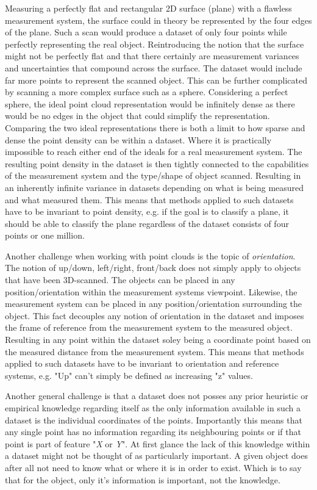 \documentclass[%
]{USN-MSc}
\begin{document}
Measuring a perfectly flat and rectangular 2D surface (plane) with a flawless measurement system, the surface could in theory be represented by the four edges of the plane. Such a scan would produce a dataset of only four points while perfectly representing the real object. Reintroducing the notion that the surface might not be perfectly flat and that there certainly are measurement variances and uncertainties that compound across the surface. The dataset would include far more points to represent the scanned object. This can be further complicated by scanning a more complex surface such as a sphere. Considering a perfect sphere, the ideal point cloud representation would be infinitely dense as there would be no edges in the object that could simplify the representation. Comparing the two ideal representations there is both a limit to how sparse and dense the point density can be within a dataset. Where it is practically impossible to reach either end of the ideals for a real measurement system. The resulting point density in the dataset is then tightly connected to the capabilities of the measurement system and the type/shape of object scanned. Resulting in an inherently infinite variance in datasets depending on what is being measured and what measured them. This means that methods applied to such datasets have to be invariant to point density, e.g. if the goal is to classify a plane, it should be able to classify the plane regardless of the dataset consists of four points or one million.

\bigskip
Another challenge when working with point clouds is the topic of \textit{orientation}. The notion of up/down, left/right, front/back does not simply apply to objects that have been 3D-scanned. The objects can be placed in any position/orientation within the measurement systems viewpoint. Likewise, the measurement system can be placed in any position/orientation surrounding the object. This fact decouples any notion of orientation in the dataset and imposes the frame of reference from the measurement system to the measured object. Resulting in any point within the dataset soley being a coordinate point based on the measured distance from the measurement system. This means that methods applied to such datasets have to be invariant to orientation and reference systems, e.g. "Up" can't simply be defined as increasing "z" values.

\bigskip
Another general challenge is that a dataset does not posses any prior heuristic or empirical knowledge regarding itself as the only information available in such a dataset is the individual coordinates of the points. Importantly this means that any single point has no information regarding its neighbouring points or if that point is part of feature "\textit{X} or \textit{Y}". At first glance the lack of this knowledge within a dataset might not be thought of as
particularly important. A given object does after all not need to  know what or where it is in order to exist.
Which is to say that for the object, only it's information is important, not the knowledge.\clearpage
\end{document}

